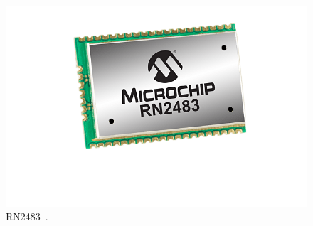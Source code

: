     \begin{figure}[H]%
        \centering
        \includegraphics[scale=0.3]{res/pictures/rn2483.png}
        \caption{RN2483~\cite{rn2483:shop}.}
        \label{fig:state-rn2483}
    \end{figure}

